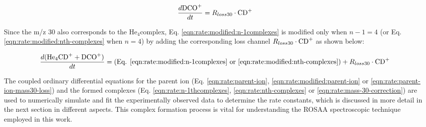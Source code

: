 \begin{equation}
    \frac{d\text{DCO}^+}{dt} = R_{loss30} \cdot \text{CD}^+
    \label{eqn:rate:mass-30-formation}
\end{equation}



Since the m/z 30 also corresponds to the He$_4$\CD complex, Eq.
\ref{eqn:rate:modified:n-1complexes} is modified only when $n-1=4$ (or Eq.
\ref{eqn:rate:modified:nth-complexes} when $n=4$) by adding the corresponding
loss channel \(R_{loss30} \cdot \text{CD}^+\) as shown below:

\begin{equation}
    \frac{d(\text{He}_4\text{CD}^+ + \text{DCO}^+)}{dt} = (\text{Eq. } \ref{eqn:rate:modified:n-1complexes} \text{ or } \ref{eqn:rate:modified:nth-complexes}) + R_{loss30} \cdot \text{CD}^+
    \label{eqn:rate:mass-30-correction}
\end{equation}

The coupled ordinary differential equations for the parent ion \CD (Eq.
\ref{eqn:rate:parent-ion}, \ref{eqn:rate:modified:parent-ion} or
\ref{eqn:rate:parent-ion-mass30-loss}) and the formed complexes (Eq.
\ref{eqn:rate:n-1thcomplexes}, \ref{eqn:rate:nth-complexes} or
\ref{eqn:rate:mass-30-correction}) are used to numerically simulate and fit the
experimentally observed data to determine the rate constants, which is
discussed in more detail in the next section in different aspects. This complex formation 
process is vital for understanding the ROSAA spectroscopic technique employed in this work.

